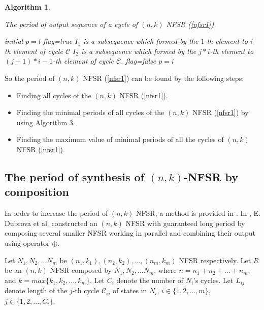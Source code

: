 \documentclass[conference]{IEEEtran}
\newtheorem{algorithm}{Algorithm}
\begin{document}

\begin{algorithm}\label{algorithm2}
\caption{The period of output sequence of a cycle of $(n,k)$ NFSR (\ref{nfsr1}).}
\begin{algorithmic}[2]
\STATE initial $p=l$
\STATE flag=true
\STATE $I_1$ is a subsequence which formed by the $1$-th element to $i$-th element of cycle $\mathcal{C}$
\STATE $I_2$ is a subsequence which formed by the $j\ast i$-th element to $(j+1)\ast i-1$-th element of cycle $\mathcal{C}$.
\STATE flag=false
\ENDIF
\ENDFOR
\ENDIF
{}
\STATE $p=i$
\ENDIF
\ENDIF
\ENDFOR
\end{algorithmic}
\end{algorithm}

So the period of $(n,k)$ NFSR (\ref{nfsr1}) can be found by the following steps:
\begin{itemize}\label{period}
  \item Finding all cycles of the $(n,k)$ NFSR (\ref{nfsr1}).
  \item Finding the minimal periods of all cycles of the $(n,k)$ NFSR (\ref{nfsr1}) by using Algorithm 3.
  \item Finding the maximum value of minimal periods of all the cycles of $(n,k)$ NFSR (\ref{nfsr1}).
\end{itemize}

\subsection{The period of synthesis of $(n,k)$-NFSR by composition}

In order to increase the period of $(n,k)$ NFSR, a method is provided in \cite{Dubrova2008On}. In \cite{Dubrova2008On}, E. Dubrova et al. constructed an $(n,k)$ NFSR with guaranteed long period by composing several smaller NFSR working in parallel and combining their output using operator $\oplus$.

Let $N_1,N_2,...N_m$ be $(n_1,k_1),(n_2,k_2),...,(n_m,k_m)$ NFSR respectively. Let $R$ be an $(n,k)$ NFSR composed by $N_1,N_2,...N_m$, where $n=n_1+n_2+...+n_m$, and $k=max\{k_1,k_2,...,k_m\}$. Let $C_i$ denote the number of $N_i$'s cycles. Let $L_{ij}$ denote length of the $j$-th cycle $\mathcal{C}_{ij}$ of states in $N_i$, $i\in\{1,2,...,m\}$, $j\in\{1,2,...,C_i\}$.
\end{document}
